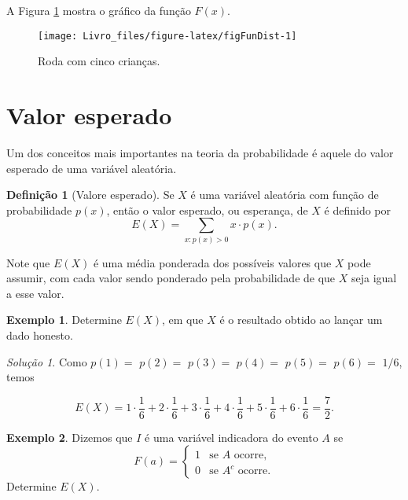 \documentclass[]{book}
\theoremstyle{definition}
\newtheorem{definition}{Definição}[chapter]
\theoremstyle{definition}
\newtheorem{example}{Exemplo}[chapter]
\theoremstyle{definition}
\theoremstyle{remark}
\newtheorem*{solution}{Solução}
\begin{document}
A Figura \ref{fig:figFunDist} mostra o gráfico da função \(F(x).\)

\begin{figure}

{\centering \texttt{[image: Livro\_files/figure-latex/figFunDist-1]} 

}

\caption{Roda com cinco crianças.}\label{fig:figFunDist}
\end{figure}

\hypertarget{valor-esperado}{%
\section{Valor esperado}\label{valor-esperado}}

Um dos conceitos mais importantes na teoria da probabilidade é aquele do valor esperado de uma variável aleatória.

\begin{definition}[Valore esperado]
\protect\hypertarget{def:defEsperanca}{}{\label{def:defEsperanca} \iffalse (Valore esperado) \fi{} }Se \(X\) é uma variável aleatória com função de probabilidade \(p(x)\), então o valor esperado, ou esperança, de \(X\) é definido por
\[E(X) = \sum_{x:p(x)>0} x\cdot p(x).\]
\end{definition}

Note que \(E(X)\) é uma média ponderada dos possíveis valores que \(X\) pode assumir, com cada valor sendo ponderado pela probabilidade de que \(X\) seja igual a esse valor.

\begin{example}
\protect\hypertarget{exm:esperancaDado}{}{\label{exm:esperancaDado} }Determine \(E(X)\), em que \(X\) é o resultado obtido ao lançar um dado honesto.
\end{example}

\begin{solution}
\iffalse{} {Solução. } \fi{}Como \(p(1)=\) \(p(2)=\) \(p(3)=\) \(p(4)=\) \(p(5)=\) \(p(6)=\) \(1/6\), temos

\[E(X) = 1\cdot \frac{1}{6} +2\cdot \frac{1}{6}+3\cdot \frac{1}{6}+4\cdot \frac{1}{6}+5\cdot \frac{1}{6}+6\cdot \frac{1}{6}=\frac{7}{2}.\]
\end{solution}

\begin{example}
\protect\hypertarget{exm:unnamed-chunk-170}{}{\label{exm:unnamed-chunk-170} }Dizemos que \(I\) é uma variável indicadora do evento \(A\) se
\begin{equation}
  F(a) =
    \begin{cases}
      1 & \text{se $A$ ocorre,}\\
      0 & \text{se $A^c$ ocorre.}
    \end{cases}       
\end{equation}
Determine \(E(X).\)
\end{example}
\end{document}
